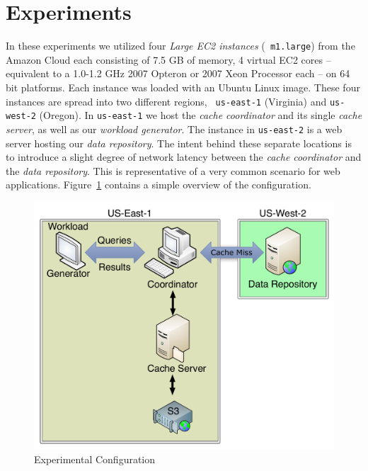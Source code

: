 \section{Experiments} %
\label{sec:experiments_storage}
In these experiments we utilized four \emph{Large EC2 instances} ({\tt
m1.large}) from the Amazon Cloud each consisting of 7.5 GB of memory, 4 virtual
EC2 cores -- equivalent to a 1.0-1.2 GHz 2007 Opteron or 2007 Xeon Processor
each -- on 64 bit platforms.  Each instance was loaded with an Ubuntu Linux
image. These four instances are spread into two different regions, {\tt
us-east-1} (Virginia) and {\tt us-west-2}
(Oregon)\cite{amazonEC2locations}. In {\tt us-east-1} we host the
\emph{cache coordinator} and its single \emph{cache server}, as well as our
\emph{workload generator}. The instance in {\tt us-east-2} is a web server
hosting our \emph{data repository}. The intent behind these separate locations
is to introduce a slight degree of network latency between the \emph{cache
coordinator} and the \emph{data repository}. This is representative of a very
common scenario for web applications. Figure~\ref{fig:ca-experiment-config}
contains a simple overview of the configuration.

\begin{figure}
\begin{center}
\includegraphics[scale=0.5]{figures/hierarchy-experiment-config.pdf}
\end{center}
\caption{Experimental Configuration}
\label{fig:ca-experiment-config}
\end{figure}

